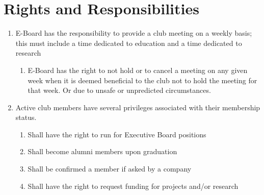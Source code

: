 
\section{Rights and Responsibilities}

\begin{enumerate}
  \item E-Board has the responsibility to provide a club meeting on a weekly
    basis; this must include a time dedicated to education and a time dedicated
    to research
  \begin{enumerate}
    \item E-Board has the right to not hold or to cancel a meeting on any given
      week when it is deemed beneficial to the club not to hold the meeting for
      that week. Or due to unsafe or unpredicted circumstances.
  \end{enumerate}
  \item Active club members have several privileges associated with their
    membership status.
  \begin{enumerate}
    \item Shall have the right to run for Executive Board positions
    \item Shall become alumni members upon graduation
    \item Shall be confirmed a member if asked by a company
    \item Shall have the right to request funding for projects and/or research
  \end{enumerate}
\end{enumerate}